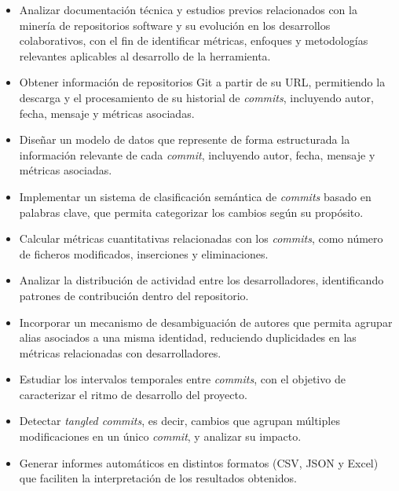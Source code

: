 \documentclass[a4paper, 12pt]{book}
\begin{document}
\begin{itemize}

\item Analizar documentación técnica y estudios previos relacionados con la minería de repositorios software y su evolución en los desarrollos colaborativos, con el fin de identificar métricas, enfoques y metodologías relevantes aplicables al desarrollo de la herramienta.

\item Obtener información de repositorios Git a partir de su URL, permitiendo la descarga y el procesamiento de su historial de \emph{commits}, incluyendo autor, fecha, mensaje y métricas asociadas.

\item Diseñar un modelo de datos que represente de forma estructurada la información relevante de cada \emph{commit}, incluyendo autor, fecha, mensaje y métricas asociadas.

\item Implementar un sistema de clasificación semántica de \emph{commits} basado en palabras clave, que permita categorizar los cambios según su propósito.

\item Calcular métricas cuantitativas relacionadas con los \emph{commits}, como número de ficheros modificados, inserciones y eliminaciones.

\item Analizar la distribución de actividad entre los desarrolladores, identificando patrones de contribución dentro del repositorio.

\item Incorporar un mecanismo de desambiguación de autores que permita agrupar alias asociados a una misma identidad, reduciendo duplicidades en las métricas relacionadas con desarrolladores.

\item Estudiar los intervalos temporales entre \emph{commits}, con el objetivo de caracterizar el ritmo de desarrollo del proyecto.

\item Detectar \emph{tangled commits}, es decir, cambios que agrupan múltiples modificaciones en un único \emph{commit}, y analizar su impacto.

\item Generar informes automáticos en distintos formatos (CSV, JSON y Excel) que faciliten la interpretación de los resultados obtenidos.

\end{itemize}
\end{document}

